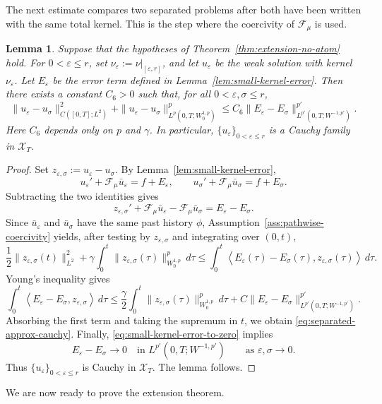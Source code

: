 \documentclass[a4paper,11pt,oneside,reqno]{amsart}
\newtheorem{lemma}[theorem]{Lemma}
\newcounter{c}
\newcounter{d}
\newcounter{b}
\newcommand{\e}{\varepsilon}
\newcommand{\dual}[2]{\left\langle #1,#2\right\rangle}
\begin{document}
The next estimate compares two separated problems after both have been
written with the same total kernel. This is the step where the coercivity of
\(\mathcal F_\mu\) is used.

\begin{lemma}\label{lem:separated-approx-cauchy}
Suppose that the hypotheses of Theorem~\ref{thm:extension-no-atom} hold.
For \(0<\e\le r\), set \(\nu_\e:=\nu|_{[\e,r]}\), and let \(u_\e\) be the
weak solution with kernel \(\nu_\e\). Let \(E_\e\) be the error term defined
in Lemma~\ref{lem:small-kernel-error}. Then there exists a constant \(C_6>0\)
such that, for all \(0<\e,\sigma\le r\),
\begin{equation}
 \|u_\e-u_\sigma\|_{C([0,T];L^2)}^2
 +
 \|u_\e-u_\sigma\|_{L^p(0,T;W^{1,p}_0)}^p
 \le
 C_6
 \|E_\e-E_\sigma\|_{L^{p'}(0,T;W^{-1,p'})}^{p'} .
 \label{eq:separated-approx-cauchy}
\end{equation}
Here \(C_6\) depends only on \(p\) and \(\gamma\). In particular,
\(\{u_\e\}_{0<\e\le r}\) is a Cauchy family in \(\mathcal X_T\).
\end{lemma}

\begin{proof}
Set \( z_{\e,\sigma}:=u_\e-u_\sigma\).
By Lemma~\ref{lem:small-kernel-error},
\[
 u_\e'+\mathcal F_\mu\bar u_\e=f+E_\e,
 \qquad
 u_\sigma'+\mathcal F_\mu\bar u_\sigma=f+E_\sigma .
\]
Subtracting the two identities gives
\[
 z_{\e,\sigma}'
 +
 \mathcal F_\mu\bar u_\e
 -
 \mathcal F_\mu\bar u_\sigma
 =
 E_\e-E_\sigma .
\]
Since \(\bar u_\e\) and \(\bar u_\sigma\) have the same past history
\(\phi\), Assumption~\ref{ass:pathwise-coercivity} yields, after testing by
\(z_{\e,\sigma}\) and integrating over \((0,t)\),
\[
 \frac12\|z_{\e,\sigma}(t)\|_{L^2}^2
 +
 \gamma\int_0^t
 \|z_{\e,\sigma}(\tau)\|_{W^{1,p}_0}^p\,d\tau
 \le
 \int_0^t
 \dual{E_\e(\tau)-E_\sigma(\tau)}
      {z_{\e,\sigma}(\tau)}
 \,d\tau .
\]
Young's inequality gives
\[
 \int_0^t
 \dual{E_\e-E_\sigma}{z_{\e,\sigma}}\,d\tau
 \le
 \frac{\gamma}{2}
 \int_0^t
 \|z_{\e,\sigma}(\tau)\|_{W^{1,p}_0}^p\,d\tau
 +
 C\|E_\e-E_\sigma\|_{L^{p'}(0,T;W^{-1,p'})}^{p'} .
\]
Absorbing the first term and taking the supremum in \(t\), we obtain
\eqref{eq:separated-approx-cauchy}. Finally,
\eqref{eq:small-kernel-error-to-zero} implies
\[
 E_\e-E_\sigma\to0
 \quad\text{in }L^{p'}(0,T;W^{-1,p'})
 \qquad\text{as }\e,\sigma\to0 .
\]
Thus \(\{u_\e\}_{0<\e\le r}\) is Cauchy in \(\mathcal X_T\). The lemma follows.
\end{proof}

We are now ready to prove the extension theorem.
\end{document}

